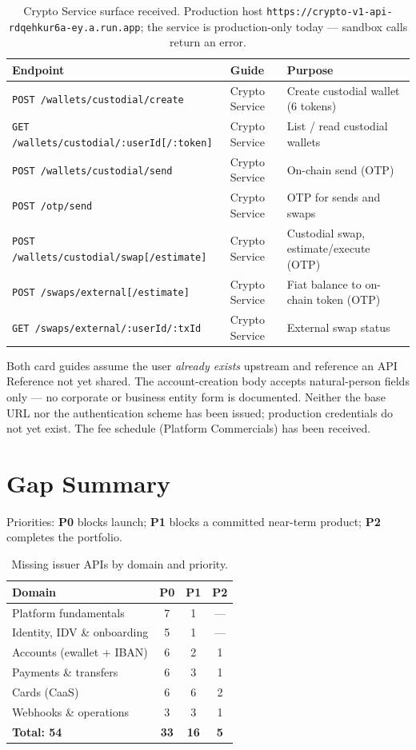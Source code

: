 \documentclass[11pt]{article}
\newcommand{\ep}[1]{\texttt{\small #1}}
\newcommand{\pri}[1]{\textbf{#1}}
\begin{document}
\begin{table}[H]
\centering
\small
\begin{tabular}{@{}lll@{}}
\toprule
\textbf{Endpoint} & \textbf{Guide} & \textbf{Purpose} \\
\midrule
\ep{POST /wallets/custodial/create} & Crypto Service & Create custodial wallet (6 tokens) \\
\ep{GET  /wallets/custodial/:userId[/:token]} & Crypto Service & List / read custodial wallets \\
\ep{POST /wallets/custodial/send} & Crypto Service & On-chain send (OTP) \\
\ep{POST /otp/send} & Crypto Service & OTP for sends and swaps \\
\ep{POST /wallets/custodial/swap[/estimate]} & Crypto Service & Custodial swap, estimate/execute (OTP) \\
\ep{POST /swaps/external[/estimate]} & Crypto Service & Fiat balance to on-chain token (OTP) \\
\ep{GET  /swaps/external/:userId/:txId} & Crypto Service & External swap status \\
\bottomrule
\end{tabular}
\caption{Crypto Service surface received. Production host
\ep{https://crypto-v1-api-rdqehkur6a-ey.a.run.app}; the service is
production-only today --- sandbox calls return an error.}
\end{table}

Both card guides assume the user \emph{already exists} upstream and reference an API Reference not yet shared. The account-creation body accepts natural-person fields only --- no corporate or business entity form is documented. Neither the base URL nor the authentication scheme has been issued; production credentials do not yet exist. The fee schedule (Platform Commercials) has been received.

\section{Gap Summary}

Priorities: \pri{P0} blocks launch; \pri{P1} blocks a committed near-term product; \pri{P2} completes the portfolio.

\begin{table}[H]
\centering
\small
\begin{tabular}{@{}lccc@{}}
\toprule
\textbf{Domain} & \textbf{P0} & \textbf{P1} & \textbf{P2} \\
\midrule
Platform fundamentals & 7 & 1 & --- \\
Identity, IDV \& onboarding & 5 & 1 & --- \\
Accounts (ewallet + IBAN) & 6 & 2 & 1 \\
Payments \& transfers & 6 & 3 & 1 \\
Cards (CaaS) & 6 & 6 & 2 \\
Webhooks \& operations & 3 & 3 & 1 \\
\midrule
\textbf{Total: 54} & \textbf{33} & \textbf{16} & \textbf{5} \\
\bottomrule
\end{tabular}
\caption{Missing issuer APIs by domain and priority.}
\end{table}
\end{document}
